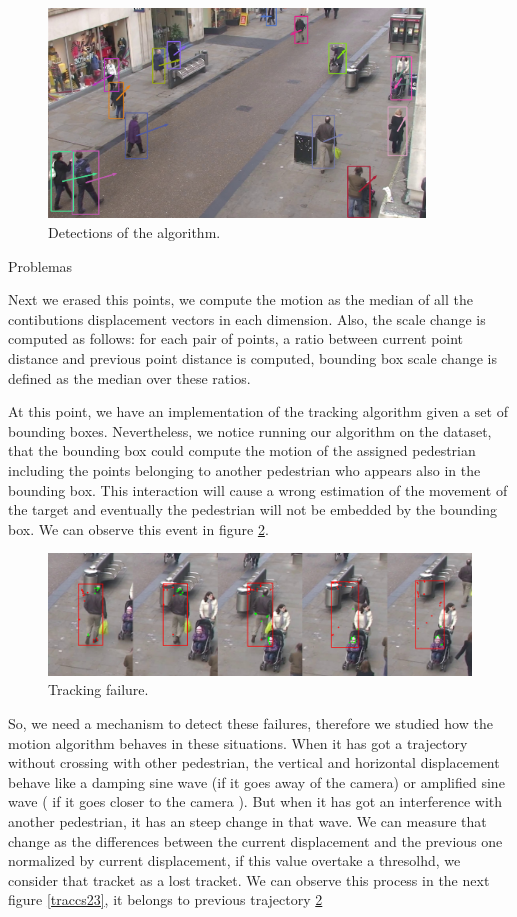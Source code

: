 \begin{figure}[H]
\centering         
\includegraphics[width=10cm]{intro/alcover2.png}
\caption{Detections of the algorithm.} \label{objectDetector1}
\end{figure}



Problemas

Next we erased this points, we compute the motion as the median of all the contibutions displacement vectors in each dimension. Also, the scale change is computed as follows: for each pair of points, a ratio between current point distance and previous point distance is computed, bounding box scale change is defined as the median over these ratios. 

At this point, we have an implementation of the tracking algorithm given a set of bounding boxes. Nevertheless, we notice running our algorithm on the dataset, that the bounding box could compute the motion of the assigned pedestrian including the points belonging to another pedestrian who appears also in the bounding box. This interaction will cause a wrong estimation of the movement of the target and eventually the pedestrian will not be embedded by the bounding box. We can observe this event in figure \ref{traccs}.


\begin{figure}[H]
\centering         
\includegraphics[width=0.9\linewidth]{velocidadas/mateuPont.png}
\caption{Tracking failure.} \label{traccs}
\end{figure}


So, we need a mechanism to detect these failures, therefore we studied how the motion algorithm behaves in these situations. When it has got a trajectory without crossing with other pedestrian, the vertical and horizontal displacement behave like a damping sine wave (if it goes away of the camera)  or amplified sine wave ( if it goes closer to the camera ). But when it has got an interference with another pedestrian, it has an steep change in that wave. We can measure that change as the differences between the current displacement and the previous one normalized by current displacement, if this value overtake a thresolhd, we consider that tracket as a lost tracket. We can observe this process in the next figure \ref{traccs23}, it belongs to previous trajectory \ref{traccs} 


